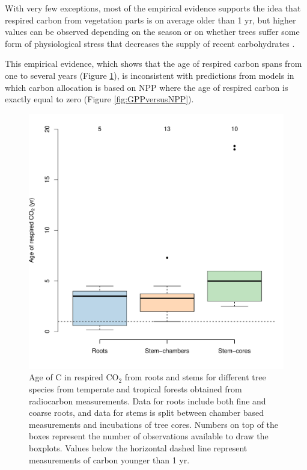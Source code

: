 \documentclass[bg, manuscript]{copernicus}
\begin{document}
With very few exceptions, most of the empirical evidence supports the idea that respired carbon from vegetation parts is on average older than 1 yr, but higher values can be observed depending on the season or on whether trees suffer some form of physiological stress that decreases the supply of recent carbohydrates \citep{Herrera2020}. 

This empirical evidence, which shows that the age of respired carbon spans from one to several years (Figure \ref{fig:ageRespiredC}), is inconsistent with predictions from models in which carbon allocation is based on NPP where the age of respired carbon is exactly equal to zero (Figure \ref{fig:GPPversusNPP}). 

\begin{figure}[t]
   \centering
   \includegraphics[scale=0.8]{Fig4_ageRespiredC.pdf} %
   \caption{Age of C in respired CO$_2$ from roots and stems for different tree species from temperate and tropical forests obtained from radiocarbon measurements. Data for roots include both fine and coarse roots, and data for stems is split between chamber based measurements and incubations of tree cores. Numbers on top of the boxes represent the number of observations available to draw the boxplots. Values below the horizontal dashed line represent measurements of carbon younger than 1 yr.} 
   \label{fig:ageRespiredC}
\end{figure}
\end{document}
